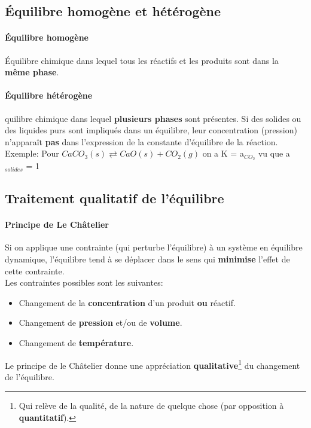 \documentclass[10pt,a4paper]{book}
\begin{document}
\subsection{Équilibre homogène et hétérogène}

\paragraph{Équilibre homogène} Équilibre chimique dans lequel tous les réactifs et les produits sont dans la \textbf{même phase}.
\paragraph{Équilibre hétérogène} 	quilibre chimique dans lequel \textbf{plusieurs phases} sont présentes. Si des solides ou des liquides purs sont impliqués dans un équilibre, leur concentration (pression) n’apparaît \textbf{pas} dans l’expression de la constante d’équilibre de la réaction. \\
Exemple: Pour \(CaCO_3(s) \rightleftarrows CaO(s) + CO_2(g)\) on a K = a$_{CO_2}$ vu que a$_{solides}$ = 1

\subsection{Traitement qualitatif de l'équilibre}

\paragraph{Principe de Le Châtelier} Si on applique une contrainte (qui perturbe l’équilibre)
à un système en équilibre dynamique, l’équilibre tend à se déplacer dans le sens qui \textbf{minimise} l’effet de cette contrainte. \\
Les contraintes possibles sont les suivantes:
\begin{itemize}
\item Changement de la \textbf{concentration} d'un produit \textbf{ou} réactif.
\item Changement de \textbf{pression} et/ou de \textbf{volume}.
\item Changement de \textbf{température}.
\end{itemize} \par
Le principe de le Châtelier donne une appréciation \textbf{qualitative}\footnote{Qui relève de la qualité, de la nature de quelque chose (par opposition à \textbf{quantitatif}).} du changement de l'équilibre.
\end{document}
